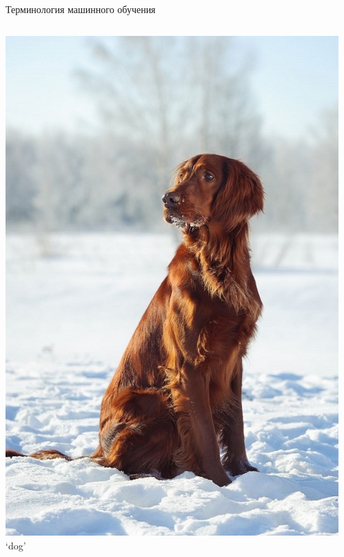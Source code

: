 \documentclass[aspectratio=169, professionalfonts]{beamer}
\begin{document}
\begin{frame}{Терминология машинного обучения}
\begin{columns}
\begin{column}{.1\linewidth}
            \includegraphics[width=\linewidth]{graphs/fig17_5.jpg}
            `dog'
        \end{column}
        \begin{column}{.1\linewidth}
            \centering

\end{column}
\end{columns}
\end{frame}
\end{document}
